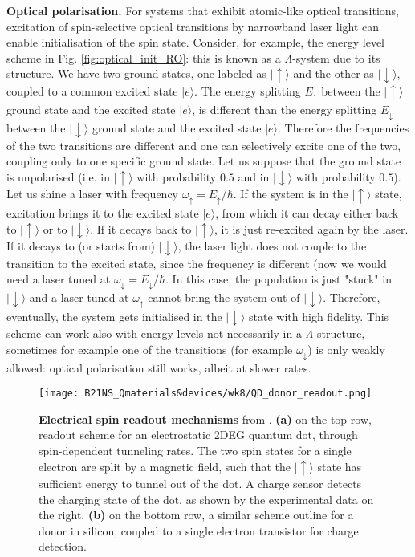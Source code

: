 \documentclass[a4paper,11pt]{article}
\newcommand{\ket}[1]{| #1 \rangle}
\begin{document}
{\bf Optical polarisation.} For systems that exhibit atomic-like optical transitions, excitation of spin-selective optical transitions by narrowband laser light can enable initialisation of the spin state. Consider, for example, the energy level scheme in Fig. \ref{fig:optical_init_RO}: this is known as a $\Lambda$-system due to its structure. We have two ground states, one labeled as $\ket{\uparrow}$ and the other as $\ket{\downarrow}$, coupled to a common excited state $\ket{e}$. The energy splitting $E_{\uparrow}$ between the $\ket{\uparrow}$ ground state and the excited state $\ket{e}$, is different than the  energy splitting $E_{\downarrow}$ between the $\ket{\downarrow}$ ground state and the excited state $\ket{e}$. Therefore the frequencies of the two transitions are different and one can selectively excite one of the two, coupling only to one specific ground state.
\newline Let us suppose that the ground state is unpolarised (i.e. in $\ket{\uparrow}$ with probability $0.5$ and in $\ket{\downarrow}$ with probability $0.5$). Let us shine a laser with frequency $\omega_{\uparrow} = E_{\uparrow}/\hbar$. If the system is in the $\ket{\uparrow}$ state, excitation brings it to the excited state $\ket{e}$, from which it can decay either back to $\ket{\uparrow}$ or to $\ket{\downarrow}$. If it decays back to $\ket{\uparrow}$, it is just re-excited again by the laser. If it decays to (or starts from) $\ket{\downarrow}$, the laser light does not couple to the transition to the excited state, since the frequency is different (now we would need a laser tuned at $\omega_{\downarrow} = E_{\downarrow}/\hbar$. In this case, the population is just "stuck" in $\ket{\downarrow}$ and a laser tuned at $\omega_{\uparrow}$ cannot bring the system out of $\ket{\downarrow}$. Therefore, eventually, the system gets initialised in the $\ket{\downarrow}$ state with high fidelity.
\newline This scheme can work also with energy levels not necessarily in a $\Lambda$ structure, sometimes for example one of the transitions (for example $\omega_{\downarrow}$) is only weakly allowed: optical polarisation still works, albeit at slower rates.

\begin{figure}[h]
\centering
\texttt{[image: B21NS\_Qmaterials\&devices/wk8/QD\_donor\_readout.png]}
\caption{ {\bf Electrical spin readout mechanisms} from \cite{morton_embracing_2011}. {\bf(a)} on the top row, readout scheme for an electrostatic 2DEG quantum dot, through spin-dependent tunneling rates. The two spin states for a single electron are split by a magnetic field, such that the $\ket{\uparrow}$ state has sufficient energy to tunnel out of the dot. A charge sensor detects the charging state of the dot, as shown by the experimental data on the right. {\bf (b)} on the bottom row, a similar scheme outline for a donor in silicon, coupled to a single electron transistor for charge detection.}
\label{fig:QD_RO}
\end{figure}
\end{document}
